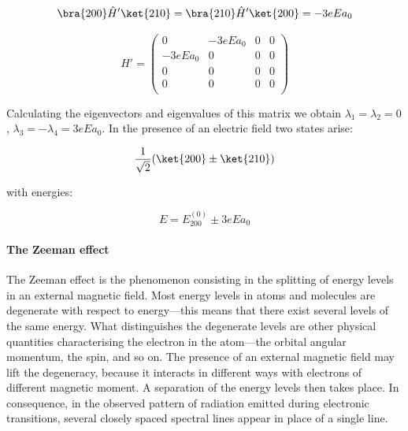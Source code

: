 \begin{equation}
    \bra{200}\hat{H}'\ket{210} = \bra{210}\hat{H}'\ket{200} = -3eEa_0
\end{equation}

\begin{equation}
\hat{H}' =
    \begin{pmatrix}
        0 & -3eEa_0 & 0 & 0 \\
        -3eEa_0 & 0 & 0 & 0\\
         0 & 0& 0 & 0\\
         0 & 0& 0 & 0\\
    \end{pmatrix}
\end{equation}

Calculating the eigenvectors and eigenvalues of this matrix we obtain $\lambda_1 = \lambda_2 = 0$, $\lambda_3 = -\lambda_4 = 3eEa_0$. In the presence of an electric field two states arise:

\begin{equation}
    \frac{1}{\sqrt{2}}(\ket{200}\pm\ket{210})
\end{equation}

with energies:

\begin{equation}
    E = E^{(0)}_{200} \pm 3eEa_0
\end{equation}

\paragraph{The Zeeman effect}

The Zeeman effect is the phenomenon consisting in the splitting of energy levels in an external magnetic field. Most energy levels in atoms and molecules are degenerate with respect to energy---this means that there exist several levels of the same energy. What distinguishes the degenerate levels are other physical quantities characterising the electron in the atom---the orbital angular momentum, the spin, and so on. The presence of an external magnetic field may lift the degeneracy, because it interacts in different ways with electrons of different magnetic moment. A separation of the energy levels then takes place. In consequence, in the observed pattern of radiation emitted during electronic transitions, several closely spaced spectral lines appear in place of a single line.

